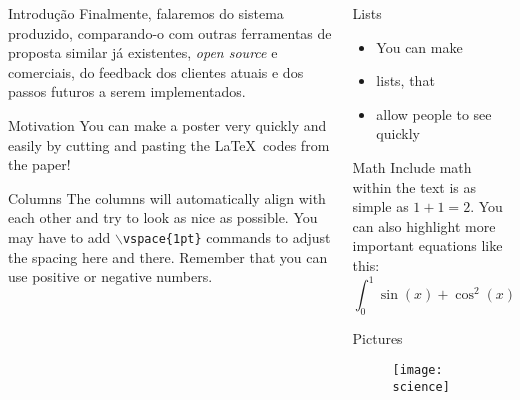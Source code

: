 \documentclass[serif,mathserif,final]{beamer}
\newcommand{\opensource}{\textit{open source}}
\begin{document}
\begin{frame}{}
\begin{columns}[t]
\begin{column}{0.32\linewidth}
\begin{block}{Introdução}
				Finalmente, falaremos do sistema produzido, comparando-o com outras ferramentas de proposta similar já existentes, \opensource{} e comerciais, do feedback dos clientes atuais e dos passos futuros a serem implementados.
      \end{block}

      \begin{block}{Motivation}
        You can make a poster very quickly and easily by cutting and pasting
        the \LaTeX~codes from the paper!
      \end{block}

      \begin{block}{Columns}
        The columns will automatically align with each other and try to look
        as nice as possible.  You may have to add {\tt$\backslash$vspace\{1pt\}}
        commands to adjust the spacing here and there.  Remember that you can
        use positive or negative numbers.
      \end{block}

    \end{column}%

    \begin{column}{0.32\linewidth}

      \begin{block}{Lists}
        \begin{itemize}
          \item You can make
          \item lists, that
          \item allow people to see quickly
        \end{itemize}
      \end{block}

      \begin{block}{Math}
        Include math within the text is as simple as $1+1=2$.  You can also
        highlight more important equations like this:
        \begin{equation*}
          \int_0^1\sin(x)+\cos^2(x)+\alpha x~d\!x
        \end{equation*}
      \end{block}

      \begin{block}{Pictures}
        \begin{figure}[htb]
          \centering
          \texttt{[image: science]}
        \end{figure}
      \end{block}


\end{column}
\end{columns}
\end{frame}
\end{document}
